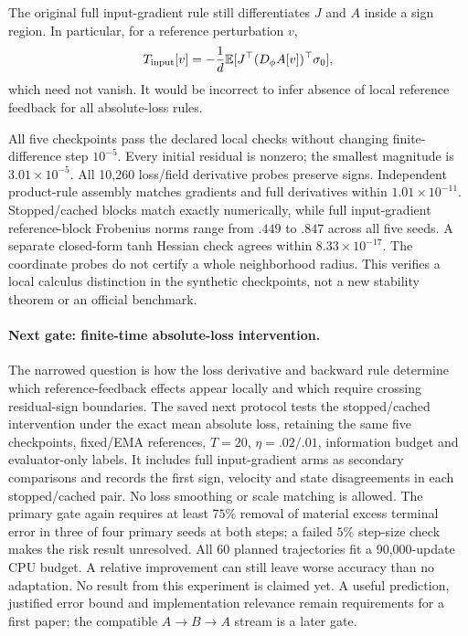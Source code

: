 \documentclass[11pt,a4paper]{article}
\newcommand{\E}{\mathbb{E}}
\begin{document}
The original full input-gradient rule still differentiates $J$ and $A$
inside a sign region. In particular, for a reference perturbation $v$,
\[
 T_{\rm input}[v]=-\frac1d\E[J^\top(D_\phi A[v])^\top\sigma_0],
\]
which need not vanish. It would be incorrect to infer absence of local
reference feedback for all absolute-loss rules.

All five checkpoints pass the declared local checks without changing
finite-difference step $10^{-5}$. Every initial residual is nonzero;
the smallest magnitude is $3.01\times10^{-5}$. All 10,260 loss/field
derivative probes preserve signs. Independent product-rule assembly
matches gradients and full derivatives within $1.01\times10^{-11}$.
Stopped/cached blocks match exactly numerically, while full input-gradient
reference-block Frobenius norms range from $.449$ to $.847$ across all
five seeds. A separate closed-form tanh Hessian check agrees within
$8.33\times10^{-17}$. The coordinate probes do not certify a whole
neighborhood radius. This verifies a local calculus distinction in the
synthetic checkpoints, not a new stability theorem or an official benchmark.

\paragraph{Next gate: finite-time absolute-loss intervention.}
The narrowed question is how the loss derivative and backward rule
determine which reference-feedback effects appear locally and which
require crossing residual-sign boundaries. The saved next protocol tests
the stopped/cached intervention under the exact mean absolute loss,
retaining the same five checkpoints, fixed/EMA references, $T=20$,
$\eta=.02/.01$, information budget and evaluator-only labels.
It includes full input-gradient arms as secondary comparisons and
records the first sign, velocity and state disagreements in each
stopped/cached pair. No loss smoothing or scale matching is allowed.
The primary gate again requires at least $75\%$ removal of material
excess terminal error in three of four primary seeds at both steps;
a failed $5\%$ step-size check makes the risk result unresolved.
All 60 planned trajectories fit a 90,000-update CPU budget. A relative
improvement can still leave worse accuracy than no adaptation.
No result from this experiment is claimed yet. A useful prediction,
justified error bound and implementation relevance remain requirements
for a first paper; the compatible $A\to B\to A$ stream is a later gate.
\end{document}
